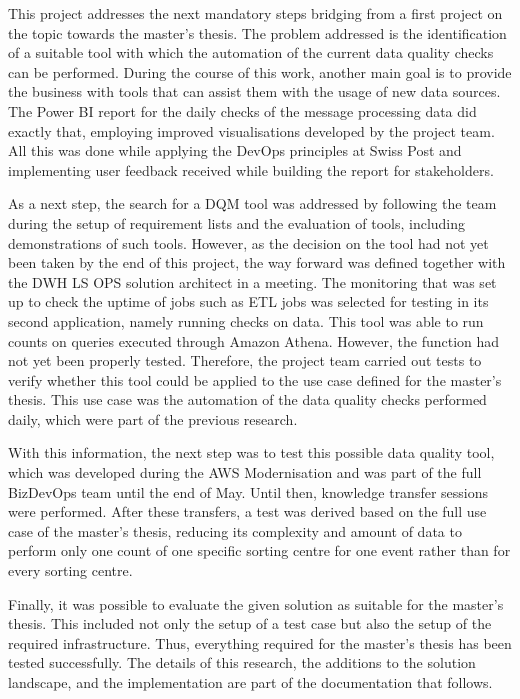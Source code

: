 
This project addresses the next mandatory steps bridging from a first project on the topic towards the master's thesis. The problem addressed is the identification of a suitable tool with which the automation of the current data quality checks can be performed. During the course of this work, another main goal is to provide the business with tools that can assist them with the usage of new data sources. The Power BI report for the daily checks of the message processing data did exactly that, employing improved visualisations developed by the project team. All this was done while applying the DevOps principles at Swiss Post and implementing user feedback received while building the report for stakeholders.

As a next step, the search for a DQM tool was addressed by following the team during the setup of requirement lists and the evaluation of tools, including demonstrations of such tools. However, as the decision on the tool had not yet been taken by the end of this project, the way forward was defined together with the DWH LS OPS solution architect in a meeting. The monitoring that was set up to check the uptime of jobs such as ETL jobs was selected for testing in its second application, namely running checks on data. This tool was able to run counts on queries executed through Amazon Athena. However, the function had not yet been properly tested. Therefore, the project team carried out tests to verify whether this tool could be applied to the use case defined for the master's thesis. This use case was the automation of the data quality checks performed daily, which were part of the previous research.

With this information, the next step was to test this possible data quality tool, which was developed during the AWS Modernisation and was part of the full BizDevOps team until the end of May. Until then, knowledge transfer sessions were performed. After these transfers, a test was derived based on the full use case of the master's thesis, reducing its complexity and amount of data to perform only one count of one specific sorting centre for one event rather than for every sorting centre.

Finally, it was possible to evaluate the given solution as suitable for the master's thesis. This included not only the setup of a test case but also the setup of the required infrastructure. Thus, everything required for the master's thesis has been tested successfully. The details of this research, the additions to the solution landscape, and the implementation are part of the documentation that follows.